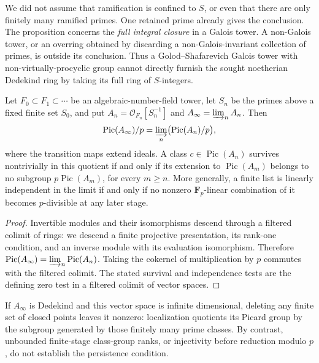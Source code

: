 \begin{remark}
We did not assume that ramification is confined to $S$, or even
that there are only finitely many ramified primes.  One retained
prime already gives the conclusion.  The proposition concerns the
\emph{full integral closure} in a Galois tower.  A non-Galois
tower, or an overring obtained by discarding a non-Galois-invariant
collection of primes, is outside its conclusion.  Thus a
Golod--Shafarevich Galois tower with non-virtually-procyclic group
cannot directly furnish the sought noetherian Dedekind ring by
taking its full ring of $S$-integers.
\end{remark}

\begin{lemma}
\label{A:A2-class-persistence}
Let $F_0\subset F_1\subset\cdots$ be an algebraic-number-field
tower, let $S_n$ be the primes above a fixed finite set $S_0$,
and put $A_n=\mathcal O_{F_n}[S_n^{-1}]$ and
$A_\infty=\varinjlim_n A_n$.  Then
\[
 \operatorname{Pic}(A_\infty)/p
   =\varinjlim_n\bigl(\operatorname{Pic}(A_n)/p\bigr),
\]
where the transition maps extend ideals.  A class
$c\in\operatorname{Pic}(A_n)$ survives nontrivially in this
quotient if and only if its extension to
$\operatorname{Pic}(A_m)$ belongs to no subgroup
$p\operatorname{Pic}(A_m)$, for every $m\ge n$.
More generally, a finite list is linearly independent in the
limit if and only if no nonzero $\mathbf F_p$-linear combination
of it becomes $p$-divisible at any later stage.
\end{lemma}

\begin{proof}
Invertible modules and their isomorphisms descend through a
filtered colimit of rings: we descend a finite projective
presentation, its rank-one condition, and an inverse module with
its evaluation isomorphism.  Therefore
$\operatorname{Pic}(A_\infty)=\varinjlim_n\operatorname{Pic}(A_n)$.
Taking the cokernel of multiplication by $p$ commutes with the
filtered colimit.  The stated survival and independence tests
are the defining zero test in a filtered colimit of vector spaces.
\end{proof}

If $A_\infty$ is Dedekind and this vector space is infinite
dimensional, deleting any finite set of closed points leaves it
nonzero: localization quotients its Picard group by the subgroup
generated by those finitely many prime classes.  By contrast,
unbounded finite-stage class-group ranks, or injectivity before
reduction modulo $p$, do not establish the persistence condition.



